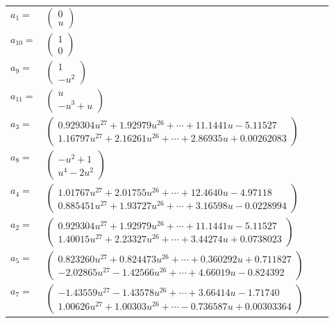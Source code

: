 \documentclass[1p]{elsarticle_modified}
\theoremstyle{definition}
\begin{document}
\begin{tabular}{m{7pt} m{180pt} m{7pt} m{180pt} }
\flushright $a_{1}=$&$\begin{pmatrix}0\\u\end{pmatrix}$ \\
\flushright $a_{10}=$&$\begin{pmatrix}1\\0\end{pmatrix}$ \\
\flushright $a_{9}=$&$\begin{pmatrix}1\\- u^2\end{pmatrix}$ \\
\flushright $a_{11}=$&$\begin{pmatrix}u\\- u^3+u\end{pmatrix}$ \\
\flushright $a_{3}=$&$\begin{pmatrix}0.929304 u^{27}+1.92979 u^{26}+\cdots+11.1441 u-5.11527\\1.16797 u^{27}+2.16261 u^{26}+\cdots+2.86935 u+0.00262083\end{pmatrix}$ \\
\flushright $a_{8}=$&$\begin{pmatrix}- u^2+1\\u^4-2 u^2\end{pmatrix}$ \\
\flushright $a_{4}=$&$\begin{pmatrix}1.01767 u^{27}+2.01755 u^{26}+\cdots+12.4640 u-4.97118\\0.885451 u^{27}+1.93727 u^{26}+\cdots+3.16598 u-0.0228994\end{pmatrix}$ \\
\flushright $a_{2}=$&$\begin{pmatrix}0.929304 u^{27}+1.92979 u^{26}+\cdots+11.1441 u-5.11527\\1.40015 u^{27}+2.23327 u^{26}+\cdots+3.44274 u+0.0738023\end{pmatrix}$ \\
\flushright $a_{5}=$&$\begin{pmatrix}0.823260 u^{27}+0.824473 u^{26}+\cdots+0.360292 u+0.711827\\-2.02865 u^{27}-1.42566 u^{26}+\cdots+4.66019 u-0.824392\end{pmatrix}$ \\
\flushright $a_{7}=$&$\begin{pmatrix}-1.43559 u^{27}-1.43578 u^{26}+\cdots+3.66414 u-1.71740\\1.00626 u^{27}+1.00303 u^{26}+\cdots-0.736587 u+0.00303364\end{pmatrix}$ \\

\end{tabular}
\end{document}
